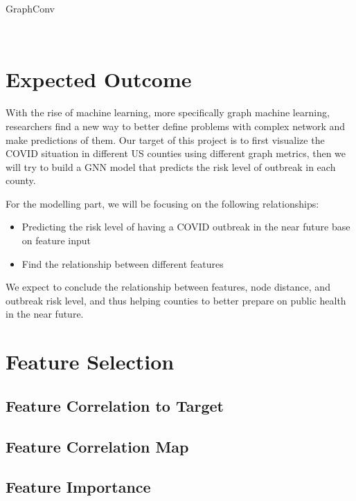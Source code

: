 GraphConv








~\cite{morris2021weisfeiler}


 \section{Expected Outcome}
With the rise of machine learning, more specifically graph machine learning, researchers find a new way to better define problems with complex network and make predictions of them. Our target of this project is to first visualize the COVID situation in different US counties using different graph metrics, then we will try to build a GNN model that predicts the risk level of outbreak in each county. 

For the modelling part, we will be focusing on the following relationships: 
\begin{itemize}
    \item Predicting the risk level of having a COVID outbreak in the near future base on feature input
    \item Find the relationship between different features 
\end{itemize} 
We expect to conclude the relationship between features, node distance, and outbreak risk level, and thus helping counties to better prepare on public health in the near future. 

\section{Feature Selection }
\subsection{Feature Correlation to Target}

\subsection{Feature Correlation Map}


\subsection{Feature Importance}





